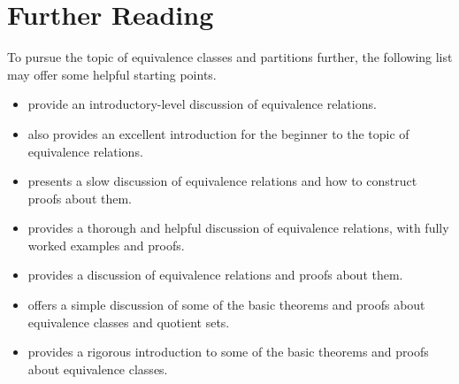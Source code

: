 \documentclass[../../../main.tex]{subfiles}
\begin{document}
\chapter{Further Reading}

To pursue the topic of equivalence classes and partitions further, the following list may offer some helpful starting points.

\begin{itemize}

  \item \citet[ch.~4]{StewartAndTall2015} provide an introductory-level discussion of equivalence relations.
  
  \item \citet[ch.~2]{Steinhart2018} also provides an excellent introduction for the beginner to the topic of equivalence relations.

  \item \citet[ch.~9]{Cummings2020} presents a slow discussion of equivalence relations and how to construct proofs about them.

  \item \citet[ch.~3]{Warner2019} provides a thorough and helpful discussion of equivalence relations, with fully worked examples and proofs.

  \item \citet[section 4.5]{Velleman2019} provides a discussion of equivalence relations and proofs about them.

  \item \citet[ch.~3]{Pinter2014} offers a simple discussion of some of the basic theorems and proofs about equivalence classes and quotient sets.

  \item \citet[ch.~6]{Jongsma2019} provides a rigorous introduction to some of the basic theorems and proofs about equivalence classes.
  
\end{itemize}
\end{document}
